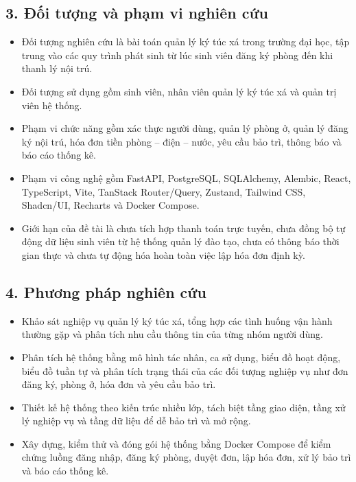 \documentclass[13pt,a4paper]{extarticle}
\begin{document}
	\subsection*{3. Đối tượng và phạm vi nghiên cứu}
	\begin{itemize}
		\item Đối tượng nghiên cứu là bài toán quản lý ký túc xá trong trường đại học, tập trung vào các quy trình phát sinh từ lúc sinh viên đăng ký phòng đến khi thanh lý nội trú.
		\item Đối tượng sử dụng gồm sinh viên, nhân viên quản lý ký túc xá và quản trị viên hệ thống.
		\item Phạm vi chức năng gồm xác thực người dùng, quản lý phòng ở, quản lý đăng ký nội trú, hóa đơn tiền phòng -- điện -- nước, yêu cầu bảo trì, thông báo và báo cáo thống kê.
		\item Phạm vi công nghệ gồm FastAPI, PostgreSQL, SQLAlchemy, Alembic, React, TypeScript, Vite, TanStack Router/Query, Zustand, Tailwind CSS, Shadcn/UI, Recharts và Docker Compose.
		\item Giới hạn của đề tài là chưa tích hợp thanh toán trực tuyến, chưa đồng bộ tự động dữ liệu sinh viên từ hệ thống quản lý đào tạo, chưa có thông báo thời gian thực và chưa tự động hóa hoàn toàn việc lập hóa đơn định kỳ.
	\end{itemize}
	
	\subsection*{4. Phương pháp nghiên cứu}
	\begin{itemize}
		\item Khảo sát nghiệp vụ quản lý ký túc xá, tổng hợp các tình huống vận hành thường gặp và phân tích nhu cầu thông tin của từng nhóm người dùng.
		\item Phân tích hệ thống bằng mô hình tác nhân, ca sử dụng, biểu đồ hoạt động, biểu đồ tuần tự và phân tích trạng thái của các đối tượng nghiệp vụ như đơn đăng ký, phòng ở, hóa đơn và yêu cầu bảo trì.
		\item Thiết kế hệ thống theo kiến trúc nhiều lớp, tách biệt tầng giao diện, tầng xử lý nghiệp vụ và tầng dữ liệu để dễ bảo trì và mở rộng.
		\item Xây dựng, kiểm thử và đóng gói hệ thống bằng Docker Compose để kiểm chứng luồng đăng nhập, đăng ký phòng, duyệt đơn, lập hóa đơn, xử lý bảo trì và báo cáo thống kê.
	\end{itemize}
	
\end{document}
